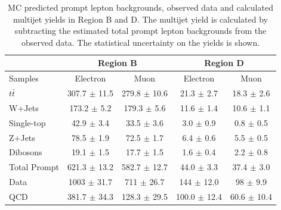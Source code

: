 \begin{table}
\begin{center}
\begin{tabular}{l|c|c||c|c}
             &\multicolumn{2}{c||}{Region B}                &\multicolumn{2}{c}{Region D} \\
\hline
Samples       & Electron               & Muon                & Electron          & Muon \\      
\hline
$t\bar{t}$    &  307.7 $\pm$ 11.5      & 279.8 $\pm$ 10.6    & 21.3 $\pm$ 2.7    & 18.3  $\pm$ 2.6  \\
W+Jets        &  173.2 $\pm$ 5.2       & 179.3 $\pm$ 5.6     & 11.6 $\pm$ 1.4    & 10.6  $\pm$ 1.1  \\        
Single-top    &  42.9  $\pm$ 3.4       & 33.5  $\pm$ 3.6     &  3.0 $\pm$ 0.9    &  0.8  $\pm$ 0.5  \\
Z+Jets        &  78.5  $\pm$ 1.9       & 72.5  $\pm$ 1.7     &  6.4 $\pm$ 0.6    &  5.5  $\pm$ 0.5  \\
Dibosons      &  19.1  $\pm$ 1.5       & 17.7  $\pm$ 1.5     &  1.6 $\pm$ 0.4    &  2.2  $\pm$ 0.8  \\
\hline
Total Prompt  &  621.3 $\pm$ 13.2      & 582.7 $\pm$ 12.7    & 44.0 $\pm$ 3.3    & 37.4  $\pm$ 3.0  \\
\hline
Data          &  1003  $\pm$ 31.7      & 711   $\pm$ 26.7    & 144  $\pm$ 12.0   & 98    $\pm$ 9.9  \\
\hline
QCD           & 381.7 $\pm$ 34.3       & 128.3 $\pm$ 29.5    & 100.0 $\pm$ 12.4  & 60.6 $\pm$ 10.4 \\
\end{tabular}
\end{center}
\caption{MC predicted prompt lepton backgrounds, observed data and calculated multijet yields
in Region B and D. The multijet yield is calculated by subtracting the estimated total prompt lepton
backgrounds from the observed data. The statistical uncertainty on the yields is shown.}
\label{tab:boosted_region_bd_promptbkgd_data}
\end{table}
 
